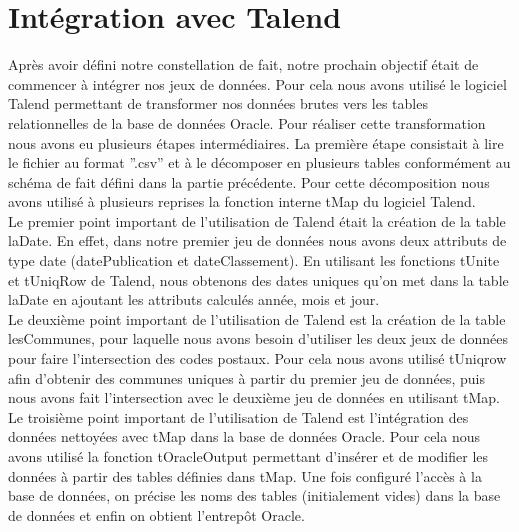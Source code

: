 \documentclass[a4paper,sffamily,12pt]{article}
\begin{document}
		\vspace{0.5cm}
				
	\section{Intégration avec Talend}

		\vspace{0.5cm}
		
		Après avoir défini notre constellation de fait, notre prochain objectif était de commencer à intégrer nos jeux de données. Pour cela nous avons utilisé le logiciel Talend permettant de transformer nos données brutes vers les tables relationnelles de la base de données Oracle. Pour réaliser cette transformation nous avons eu plusieurs étapes intermédiaires. La première étape consistait à lire le fichier au format ''.csv'' et à le décomposer en plusieurs tables conformément au schéma de fait défini dans la partie précédente. Pour cette décomposition nous avons utilisé à plusieurs reprises la fonction interne tMap du logiciel Talend. \\
		
    		\indent Le premier point important de l’utilisation de Talend était la création de la table laDate. En effet, dans notre premier jeu de données nous avons deux attributs de type date (datePublication et dateClassement). En utilisant les fonctions tUnite et tUniqRow de Talend, nous obtenons des dates uniques qu’on met dans la table laDate en ajoutant les attributs calculés année, mois et jour. \\
    		
    		\indent Le deuxième point important de l’utilisation de Talend est la création de la table lesCommunes, pour laquelle nous avons besoin d’utiliser les deux jeux de données pour faire l’intersection des codes postaux. Pour cela nous avons utilisé tUniqrow afin d'obtenir des communes uniques à partir du premier jeu de données, puis nous avons fait l’intersection avec le deuxième jeu de données en utilisant tMap. \\
    		
    		\indent Le troisième point important de l’utilisation de Talend est l’intégration des données nettoyées avec tMap dans la base de données Oracle. Pour cela nous avons utilisé la fonction tOracleOutput permettant d'insérer et de modifier les données à partir des tables définies dans tMap. Une fois configuré l’accès à la base de données, on précise les noms des tables (initialement vides) dans la base de données et enfin on obtient l'entrepôt Oracle. \\		
		
\end{document}

